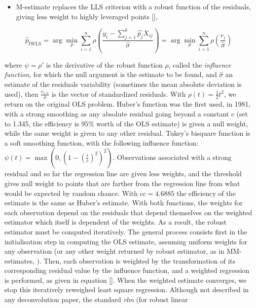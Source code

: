 \begin{itemize}

\item
  M-estimate replaces the LLS criterion with a robust function of the
  residuals, giving less weight to highly leveraged points {[}{]},
\end{itemize}

\[
\hat{p}_{\text{IWLS}} =  \arg \min_{p} \sum_{i=1}^n \rho\left(\frac{y_i - \sum_{j=1}^k \hat{p_j} X_{ij}}{\hat{\sigma}}\right) = \arg \min_{p} \sum_{i=1}^n \rho\left(\frac{r_i}{\hat{\sigma}}\right)
\] 

where \(\psi = \rho'\) is the derivative of the robust function
\(\rho\), called the \emph{influence function}, for which the null
argument is the estimate to be found, and \({\hat{\sigma}}\) an estimate
of the residuals variability (sometimes the mean absolute deviation is
used), then \(\frac{r_{1:n}}{\hat{\sigma}}\) is the vector of
standardized residuals. With \(\rho(t)=\frac{1}{2}t^2\), we return on
the original OLS problem. Huber's function was the first used, in 1981,
with a strong smoothing as any absolute residual going beyond a constant
\(c\) (set to 1.345, the efficiency is \(95\%\) worth of the OLS
estimate) is given a null weight, while the same weight is given to any
other residual. Tukey's bisquare function is a soft smoothing function,
with the following influence function:
\(\psi(t)= \max \left(0, \left(1 - (\frac{t}{c})^2\right)^2\right)\).
Observations associated with a strong residual and so far the regression
line are given less weights, and the threshold gives null weight to
points that are farther from the regression line from what would be
expected by random chance. With c\(c=4.6885\) the efficiency of the
estimate is the same as Huber's estimate. With both functions, the
weights for each observation depend on the residuals that depend
themselves on the weighted estimator which itself is dependent of the
weights. As a result, the robust estimator must be computed iteratively.
The general process consists first in the initialisation step in
computing the OLS estimate, assuming uniform weights for any observation
(or any other weight returned by robust estimator, as in MM-estimates,
\autocite{yohai87}). Then, each observation
is weighted by the transformation of its corresponding residual value by
the influence function, and a weighted regression is performed, as given
in equation {[}{]}. When the weighted estimate converges, we stop this
iteratively reweighed least square regression. Although not described in
any deconvolution paper, the standard \emph{rlm} (for robust linear

